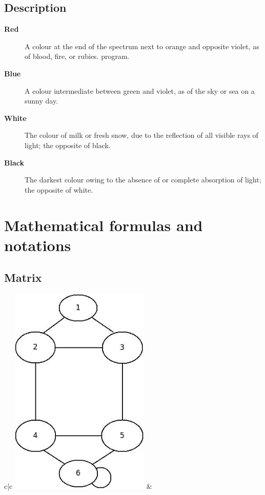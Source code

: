 \documentclass[titlepage,a4paper]{article}
\begin{document}
\subsection{Description}
	\begin{description}
		\item[\textbf{Red}] A colour at the end of the spectrum next to orange and opposite violet,
as of blood, fire, or rubies. program.
		\item[\textbf{Blue}] A colour intermediate between green and violet, as of the sky or sea on
a sunny day.
		\item[\textbf{White}] The colour of milk or fresh snow, due to the reflection of all visible
rays of light; the opposite of black.
		\item[\textbf{Black}] The darkest colour owing to the absence of or complete absorption of
light; the opposite of white.
	\end{description}

\section{Mathematical formulas and notations}
\subsection{Matrix}
\begin{tabular}{c|c}
\includegraphics[width=0.5\textwidth]{diagramSection2.jpeg}
&
 \qquad
\end{tabular}
\end{document}
